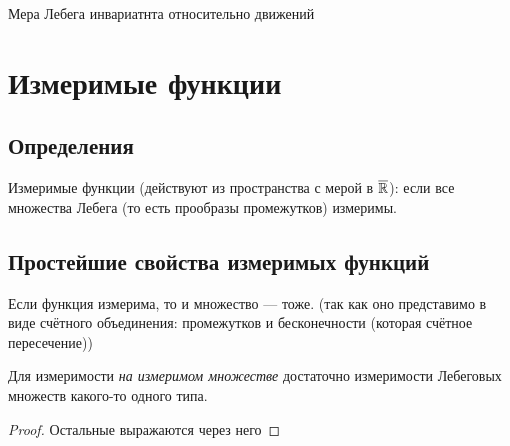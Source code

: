 \documentclass[12pt, a4paper, oneside]{memoir}
\begin{document}
\begin{corollary}
    Мера Лебега инвариатнта относительно движений
\end{corollary}




\section{Измеримые функции}

\subsection{Определения}

Измеримые функции (действуют из пространства с мерой в $\overline{{\mathbb{R}}}$):
если все множества Лебега (то есть прообразы промежутков) измеримы.


\subsection{Простейшие свойства измеримых функций}

\begin{claim}
    Если функция измерима, то и множество — тоже.
    (так как оно представимо в виде счётного объединения: промежутков и бесконечности (которая счётное пересечение))
\end{claim}

\begin{lemma}
   Для измеримости \textit{на измеримом множестве} достаточно измеримости Лебеговых множеств какого-то одного типа.

   \begin{proof}
       Остальные выражаются через него 
   \end{proof}
\end{lemma}
\end{document}
